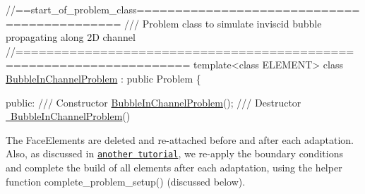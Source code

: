  
\begin{DoxyCodeInclude}
\textcolor{comment}{//==start\_of\_problem\_class============================================}
\textcolor{comment}{/// Problem class to simulate inviscid bubble propagating along 2D channel}
\textcolor{comment}{}\textcolor{comment}{//====================================================================}
\textcolor{keyword}{template}<\textcolor{keyword}{class} ELEMENT>
\textcolor{keyword}{class }\hyperlink{classBubbleInChannelProblem}{BubbleInChannelProblem} : \textcolor{keyword}{public} Problem
\{

\textcolor{keyword}{public}:
\textcolor{comment}{}
\textcolor{comment}{ /// Constructor}
\textcolor{comment}{} \hyperlink{classBubbleInChannelProblem_a04bf2f20c65e85228fac381d786bedad}{BubbleInChannelProblem}();
 \textcolor{comment}{}
\textcolor{comment}{ /// Destructor}
\textcolor{comment}{} \hyperlink{classBubbleInChannelProblem_a7a048a26898571d0f109df2a11f08eb7}{~BubbleInChannelProblem}()

\end{DoxyCodeInclude}


The {\ttfamily Face\+Elements} are deleted and re-\/attached before and after each adaptation. Also, as discussed in \href{../../../meshes/mesh_from_inline_triangle/html/index.html#overview}{\tt another tutorial}, we re-\/apply the boundary conditions and complete the build of all elements after each adaptation, using the helper function {\ttfamily complete\+\_\+problem\+\_\+setup()} (discussed below).


